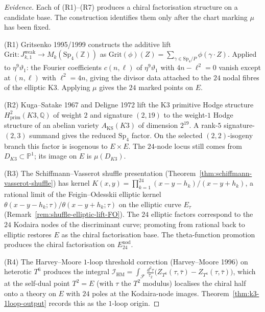 \begin{proof}[Evidence]
Each of \textup{(R1)}--\textup{(R7)} produces a chiral factorisation
structure on a candidate base. The construction identifies them only after the chart marking \(\mu\) has been fixed.

\textup{(R1)} Gritsenko 1995/1999 constructs the
additive lift
$\mathrm{Grit}\colon J_{k,1}^{\mathrm{weak}}\to M_k(\mathrm{Sp}_4(\mathbb{Z}))$
as $\mathrm{Grit}(\phi)(Z) = \sum_{\gamma\in\mathrm{Sp}_4/P} \phi(\gamma\cdot Z)$.
Applied to $\eta^9\vartheta_1$: the Fourier coefficients
$c(n,\ell)$ of $\eta^9\vartheta_1$ with $4n - \ell^2 = 0$ vanish except at
$(n,\ell)$ with $\ell^2 = 4n$, giving the divisor data attached to the \(24\) nodal fibres of the elliptic K3. Applying \(\mu\) gives the \(24\) marked points on \(E\).

\textup{(R2)} Kuga--Satake 1967 and Deligne 1972 lift the
K3 primitive Hodge structure
$H^2_{\mathrm{prim}}(K3,\mathbb{Q})$ of weight $2$ and signature
$(2,19)$ to the weight-$1$ Hodge structure of an abelian variety
$A_{\mathrm{KS}}(K3)$ of dimension $2^{19}$. A rank-\(5\) signature-\((2,3)\) summand gives the reduced \(\mathrm{Sp}_4\) factor. On the selected \((2,2)\)-isogeny branch this factor is isogenous to \(E\times E\). The \(24\)-node locus still comes from \(D_{K3}\subset\mathbb P^1\); its image on \(E\) is \(\mu(D_{K3})\).

\textup{(R3)} The Schiffmann--Vasserot shuffle presentation
(Theorem~\ref{thm:schiffmann-vasserot-shuffle}) has kernel
$K(x,y) = \prod_{k=1}^{24}(x-y-h_k)/(x-y+h_k)$, a rational limit of
the Feigin--Odesskii elliptic kernel
$\theta(x-y-h_k;\tau)/\theta(x-y+h_k;\tau)$ on the elliptic curve
$E_\tau$ (Remark~\ref{rem:shuffle-elliptic-lift-FO}). The $24$
elliptic factors correspond to the $24$ Kodaira nodes of the
discriminant curve; promoting from rational back to elliptic restores
$E$ as the chiral factorisation base. The theta-function promotion
produces the chiral factorisation on $E^{\mathrm{nod}}_{24}$.

\textup{(R4)} The Harvey--Moore $1$-loop threshold
correction (Harvey--Moore 1996) on heterotic $T^6$ produces the
integral
$\mathcal{I}_{\mathrm{HM}} = \int_{\mathcal{F}}\frac{d^2\tau}{\tau_2}
\bigl(Z_{T^6}(\tau,\bar\tau) - Z_{T^4}(\tau,\bar\tau)\bigr)$,
which at the self-dual point $T^2 = E$ (with $\tau$ the $T^2$ modulus)
localises the chiral half onto a theory on $E$ with $24$ poles at the
Kodaira-node images. Theorem~\ref{thm:k3-1loop-output} records this
as the $1$-loop origin.


\end{proof}
